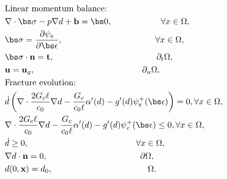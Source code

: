 \begin{mdframed}[
  frametitle={Strong form},
  frametitlebackgroundcolor=gray!20,
  backgroundcolor=gray!5,
  linewidth=0pt,
  nobreak=true
  ]
  \vspace{-1em}
  \begin{align}
    &\text{Linear momentum balance: }\nonumber \\ & \nabla \cdot \bs\sigma -p\nabla d + \textbf{b} = \bs 0,                       \hspace{2cm} \forall x \in \Omega, \\ 
                                     & \bs\sigma = \frac{\partial\psi_e}{\partial \bs\epsilon},   \hspace{3.8cm}                 \forall x \in \Omega, \\
                                     & \bs\sigma\cdot \textbf{n} = \textbf{t},                             \hspace{4.2cm}              \partial_t\Omega,  
                                     \\
                                     & \textbf{u} = \textbf{u}_g,                                                  \hspace{4.4cm}     \partial_u\Omega ,                \\
    &\text{Fracture evolution: }\nonumber \\      
    & \dot d\left(\nabla\cdot\frac{2G_c\ell}{c_0}\nabla d - \frac{G_c}{c_0\ell}\alpha'(d) - g'(d)\psi_e^+ (\bs\epsilon)\right) = 0,                                        \forall x \in \Omega,           \\
    & \nabla \cdot \frac{2G_c\ell}{c_0}\nabla d - \frac{G_c}{c_0\ell}\alpha'(d) - g'(d)\psi_e^+ (\bs\epsilon) \le 0,                                         \forall x \in \Omega,  \label{damage ineq}         \\
                                     & \dot d \ge  0,                                     \hspace{4.4cm}     \forall x \in \Omega, \\
                                     & \nabla d\cdot\textbf{n} = 0,                      \hspace{3.8cm}       \partial\Omega, \\
                                         & d(0,\textbf{x}) = d_0,                         \hspace{3.9cm}           \Omega.                                  
    \end{align}
\end{mdframed}

